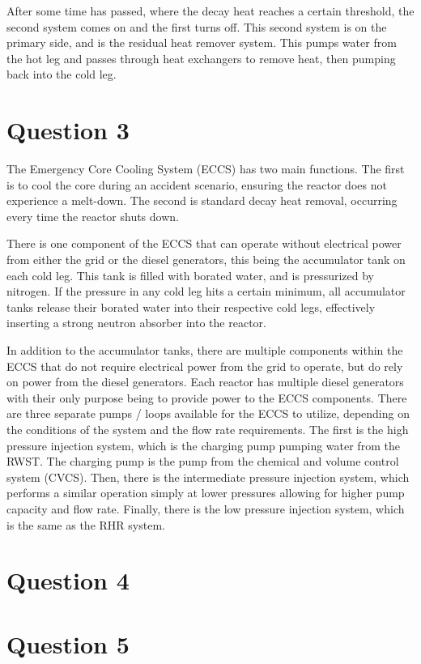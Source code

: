 \documentclass{article}
\begin{document}
After some time has passed, where the decay heat reaches a certain threshold, the second system comes on and the first turns off. This second system is on the primary side, and is the residual heat remover system. This pumps water from the hot leg and passes through heat exchangers to remove heat, then pumping back into the cold leg. 

\section{Question 3}

The Emergency Core Cooling System (ECCS) has two main functions. The first is to cool the core during an accident scenario, ensuring the reactor does not experience a melt-down. The second is standard decay heat removal, occurring every time the reactor shuts down. 

There is one component of the ECCS that can operate without electrical power from either the grid or the diesel generators, this being the accumulator tank on each cold leg. This tank is filled with borated water, and is pressurized by nitrogen. If the pressure in any cold leg hits a certain minimum, all accumulator tanks release their borated water into their respective cold legs, effectively inserting a strong neutron absorber into the reactor. 

In addition to the accumulator tanks, there are multiple components within the ECCS that do not require electrical power from the grid to operate, but do rely on power from the diesel generators. Each reactor has multiple diesel generators with their only purpose being to provide power to the ECCS components. There are three separate pumps / loops available for the ECCS to utilize, depending on the conditions of the system and the flow rate requirements. The first is the high pressure injection system, which is the charging pump pumping water from the RWST. The charging pump is the pump from the chemical and volume control system (CVCS). Then, there is the intermediate pressure injection system, which performs a similar operation simply at lower pressures allowing for higher pump capacity and flow rate. Finally, there is the low pressure injection system, which is the same as the RHR system.

\section{Question 4}

\section{Question 5}
\end{document}
